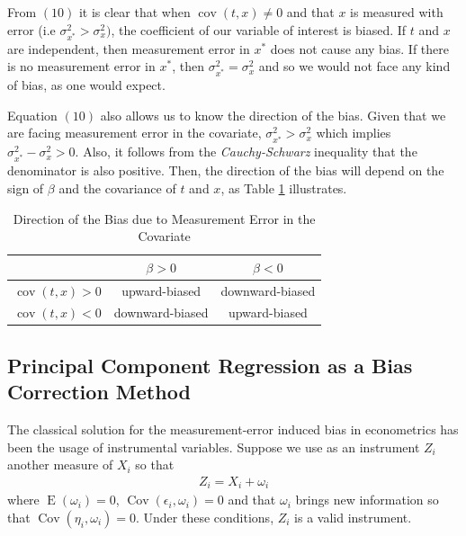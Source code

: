 \documentclass[10pt]{article}
\def\b{\beta}
\begin{document}
       From $(10)$ it is clear that when $\operatorname{cov}(t,x)\neq 0$ and that $x$ is measured with error (i.e $\sigma_{x^*}^2>\sigma_x^2)$, the coefficient of our variable of interest is biased. If $t$ and $x$ are independent, then measurement error in $x^*$ does not cause any bias. If there is no measurement error in $x^*$, then $\sigma^2_{x^*}=\sigma^2_x$ and so we would not face any kind of bias, as one would expect.
        
        Equation $(10)$ also allows us to know the direction of the bias. Given that we are facing measurement error in the covariate, $\sigma^2_{x^*}>\sigma^2_x$ which implies $\sigma^2_{x^*}-\sigma^2_x>0$. Also, it follows from the \textit{Cauchy-Schwarz} inequality that the denominator is also positive. Then, the direction of the bias will depend on the sign of $\beta$ and the covariance of $t$ and $x$, as Table \ref{bias_direction} illustrates.
        
        \begin{table}[H]
            \centering
            \caption{Direction of the Bias due to Measurement Error in the Covariate}
            \label{bias_direction}
            \begin{tabular}{|c|c|c|}\hline \hline
              & $\b>0$  & $\b<0$ \\ \hline
             $\operatorname{cov}(t,x)>0$ & upward-biased & downward-biased \\ \hline
             $\operatorname{cov}(t,x)<0$ & downward-biased & upward-biased \\ \hline
            \end{tabular} 
        \end{table}
        
    \subsection*{Principal Component Regression as a Bias Correction Method}
        
        The classical solution for the measurement-error induced bias in econometrics has been the usage of instrumental variables. Suppose we use as an instrument $Z_i$ another measure of $X_i$ so that
        \begin{align}
            Z_i=X_i+\omega_i
        \end{align}
        where $\operatorname{E}(\omega_i)=0$, $\operatorname{Cov}(\epsilon_i,\omega_i)=0$ and that $\omega_i$ brings new information so that $\operatorname{Cov}(\eta_i,\omega_i)=0$.  Under these conditions, $Z_i$ is a valid instrument.
\end{document}
